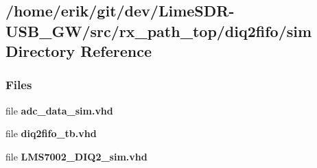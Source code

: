 \subsection{/home/erik/git/dev/\+Lime\+S\+D\+R-\/\+U\+S\+B\+\_\+\+G\+W/src/rx\+\_\+path\+\_\+top/diq2fifo/sim Directory Reference}
\label{dir_801ef109f4fab9ab025abb580b3237c5}
\subsubsection*{Files}
\begin{DoxyCompactItemize}
\item 
file {\bf adc\+\_\+data\+\_\+sim.\+vhd}
\item 
file {\bf diq2fifo\+\_\+tb.\+vhd}
\item 
file {\bf L\+M\+S7002\+\_\+\+D\+I\+Q2\+\_\+sim.\+vhd}
\end{DoxyCompactItemize}
